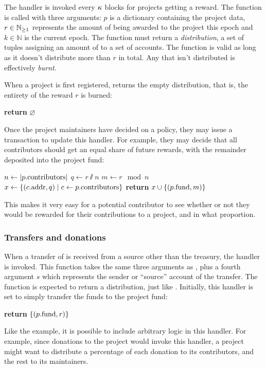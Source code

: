 The  handler is invoked every $\kappa$ blocks for
projects getting a reward. The function is called with three arguments: $p$ is
a dictionary containing the project data, $r \in \mathbb{N}_{\geq 1}$ represents the amount
of \oscoin{} being awarded to the project this epoch and $k \in \mathbb{N}$ is the
current epoch. The function must return a \emph{distribution}, a set of tuples
assigning an amount of \oscoin{} to a set of accounts. The function is valid
as long as it doesn't distribute more than $r$ \oscoin{} in total. Any \oscoin{}
that isn't distributed is effectively \emph{burnt}.

When a project is first registered,  returns the empty
distribution, that is, the entirety of the reward $r$ is burned:
\begin{algorithmic}[0]
        \State \textbf{return} $\varnothing$
    \EndProcedure
\end{algorithmic}

\noindent Once the project maintainers have decided on a policy, they may issue a
transaction to update this handler. For example, they may decide that all
contributors should get an equal share of future rewards, with the remainder
deposited into the project fund:

\begin{algorithmic}[0]
        \State $n \gets |p.{\mathrm{contributors}}|$
        \State $q \gets r \sslash n$
        \State $m \gets r \mod n$
        \State $x \gets \{ (c.{\mathrm{addr}}, q) \mid c \gets p.{\mathrm{contributors}} \}$
        \State \textbf{return} $x \cup \{ (p.{\mathrm{fund}}, m) \}$
    \EndProcedure
\end{algorithmic}
This makes it very easy for a potential contributor to see whether or not they
would be rewarded for their contributions to a project, and in what proportion.

\subsubsection{Transfers and donations}

When a transfer of \oscoin{} is received from a source other than the treasury,
the  handler is invoked. This function takes the same
three arguments as , plus a fourth argument $s$ which
represents the sender or ``source'' account of the transfer. The function is
expected to return a distribution, just like . Initially,
this handler is set to simply transfer the funds to the project fund:
\medskip
\begin{algorithmic}[0]
        \State \textbf{return} $\{ (p.{\mathrm{fund}}, r) \}$
    \EndProcedure
\end{algorithmic}
Like the  example, it is possible to include
arbitrary logic in this handler. For example, since donations to the project
would invoke this handler, a project might want to distribute a percentage
of each donation to its contributors, and the rest to its maintainers.

